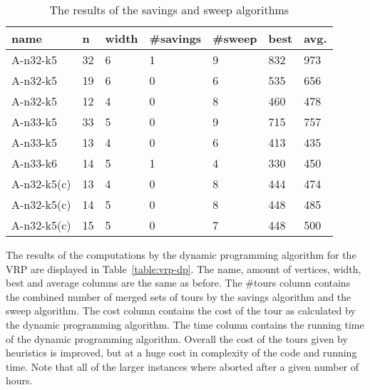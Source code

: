 \documentclass[titlepage, 12pt]{article}
\begin{document}
    \begin{table}
    \begin{tabular}{l l l l l l l}
        name        & n     & width & \#savings & \#sweep   & best  & avg. \\ \hline
        A-n32-k5    & 32    & 6     & 1         & 9         & 832   & 973 \\
        A-n32-k5    & 19    & 6     & 0         & 6         & 535   & 656 \\
        A-n32-k5    & 12    & 4     & 0         & 8         & 460   & 478 \\
        A-n33-k5    & 33    & 5     & 0         & 9         & 715   & 757 \\
        A-n33-k5    & 13    & 4     & 0         & 6         & 413   & 435 \\
        A-n33-k6    & 14    & 5     & 1         & 4         & 330   & 450 \\
        A-n32-k5(c) & 13    & 4     & 0         & 8         & 444   & 474 \\
        A-n32-k5(c) & 14    & 5     & 0         & 8         & 448   & 485 \\
        A-n32-k5(c) & 15    & 5     & 0         & 7         & 448   & 500 \\
    \end{tabular}
    \caption{The results of the savings and sweep algorithms}
    \label{table:vrp-heuristics}
    \end{table}

    The results of the computations by the dynamic programming algorithm for the VRP are displayed
    in Table~\ref{table:vrp-dp}. The name, amount of vertices, width, best and average columns are
    the same as before. The \#tours column contains the combined number of merged sets of tours by
    the savings algorithm and the sweep algorithm. The cost column contains the cost of the tour as
    calculated by the dynamic programming algorithm. The time column contains the running time of
    the dynamic programming algorithm.
    Overall the cost of the tours given by heuristics is improved, but at a huge cost in complexity
    of the code and running time.
    Note that all of the larger instances where aborted after a given number of hours.
\end{document}
